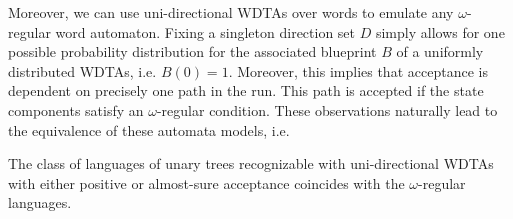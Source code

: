 Moreover, we can use uni-directional \acp{WDTA} over words to emulate any
$\omega$-regular word automaton. Fixing a singleton direction set $D$ simply
allows for one possible probability distribution for the associated blueprint
$B$ of a uniformly distributed \acp{WDTA}, i.e. $B(0) = 1$. Moreover, this
implies that acceptance is dependent on precisely one path in the run. This
path is accepted if the state components satisfy an $\omega$-regular condition.
These observations naturally lead to the equivalence of these automata models,
i.e.
\begin{theorem}
  The class of languages of unary trees recognizable with uni-directional
  \acp{WDTA} with either positive or almost-sure acceptance coincides with the
  $\omega$-regular languages.
  \label{thm:omegaregaswdta}
\end{theorem}
